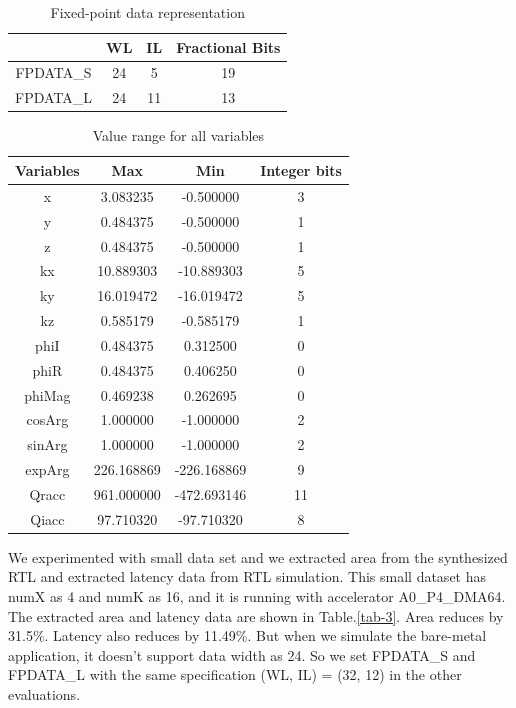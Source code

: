 \begin{table}[h!]
    \centering
    \begin{tabular}{c|c|c|c}
    \hline
        & WL & IL & Fractional Bits \\
        \hline
   FPDATA\_S &  24  & 5  & 19 \\ 
FPDATA\_L &  24 & 11   & 13\\
    \hline
    \end{tabular}
    \caption{Fixed-point data representation}
    \label{tab-4}
\end{table}

\begin{table}[ht!]
    \centering
    \begin{tabular}{c|c|c|c}
    \hline \hline
   Variables &       Max&    Min& Integer bits\\
   \hline \hline
 x&     3.083235        &-0.500000& 3 \\
 y&     0.484375        &-0.500000& 1 \\
 z&     0.484375        &-0.500000& 1 \\
 kx&    10.889303       &-10.889303& 5 \\
 ky&    16.019472       &-16.019472& 5 \\
 kz&    0.585179        &-0.585179& 1\\
 phiI   &0.484375       &0.312500& 0 \\
 phiR   &0.484375       &0.406250& 0 \\
 phiMag &0.469238       &0.262695& 0 \\
 cosArg&        1.000000        &-1.000000& 2\\
 sinArg &1.000000       &-1.000000& 2 \\
 \hline
 expArg &226.168869     &-226.168869& 9 \\
 Qracc  &961.000000     &-472.693146& 11 \\
 Qiacc  &97.710320      &-97.710320& 8 \\
\hline \hline
    \end{tabular}
    \caption{Value range for all variables}
    \label{tab-8}
\end{table}

We experimented with small data set and we extracted area from the synthesized
RTL and extracted latency data from RTL simulation. This small dataset has numX
as 4 and numK as 16, and it is running with accelerator A0\_P4\_DMA64. The
extracted area and latency data are shown in Table.\ref{tab-3}. Area reduces by
31.5\%. Latency also reduces by 11.49\%. But when we simulate the bare-metal
application, it doesn't support data width as 24. So we set FPDATA\_S and
FPDATA\_L with the same specification (WL, IL) = (32, 12) in the other
evaluations.  \\

